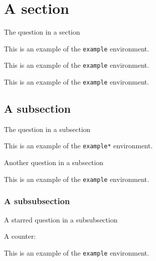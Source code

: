 \documentclass{scrartcl}
\begin{document}
\section{A section}

\begin{question}\label{qu:section}
The question in a section
\end{question}

\begin{example}
    This is an example of the \texttt{example} environment.
\end{example}

\begin{example}
    This is an example of the \texttt{example} environment.
\end{example}

\begin{example}
    This is an example of the \texttt{example} environment.
\end{example}

\subsection{A subsection}

\begin{question}
The question in a subsection
\end{question}


\begin{example*}
    This is an example of the \texttt{example*} environment.
\end{example*}

\begin{question}\label{qu:confuse}
Another question in a subsection
\end{question}

\begin{example}
    This is an example of the \texttt{example} environment.
\end{example}

\subsubsection{A subsubsection}

\begin{question*}
A starred question in a subsubsection
\end{question*}

A counter: 

\begin{example}
    This is an example of the \texttt{example} environment.
\end{example}
\end{document}
